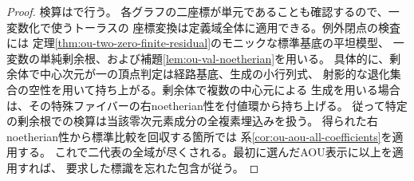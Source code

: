 \begin{proof}
検算はで行う。
各グラフの二座標が単元であることも確認するので、一変数化で使うトーラスの
座標変換は定義域全体に適用できる。例外閉点の検査には
定理\ref{thm:ou-two-zero-finite-residual}のモニックな標準基底の平坦模型、
一変数の単純剰余根、および補題\ref{lem:ou-val-noetherian}を用いる。
具体的に、剰余体で中心次元が一の頂点判定は経路基底、生成の小行列式、
射影的な退化集合の空性を用いて持ち上がる。剰余体で複数の中心元による
生成を用いる場合は、その特殊ファイバーの右noetherian性を付値環から持ち上げる。
従って特定の剰余根での検算は当該零次元素成分の全複素埋込みを扱う。
得られた右noetherian性から標準比較を回収する箇所では
系\ref{cor:ou-aou-all-coefficients}を適用する。
これで二代表の全域が尽くされる。最初に選んだAOU表示に以上を適用すれば、
要求した標識を忘れた包含が従う。
\end{proof}
